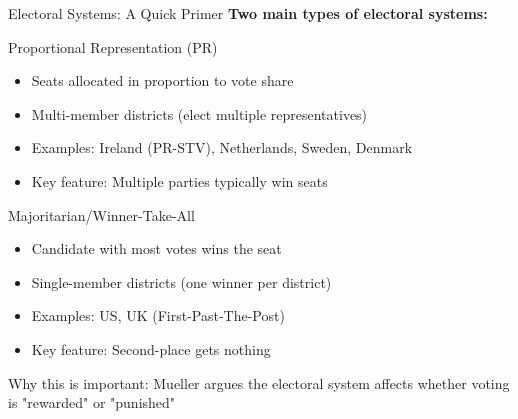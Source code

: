 \documentclass[10pt]{beamer}
\begin{document}
\begin{frame}{Electoral Systems: A Quick Primer}
\textbf{Two main types of electoral systems:}

\begin{block}{Proportional Representation (PR)}
\begin{itemize}
\item Seats allocated in proportion to vote share
\item Multi-member districts (elect multiple representatives)
\item Examples: Ireland (PR-STV), Netherlands, Sweden, Denmark
\item Key feature: Multiple parties typically win seats
\end{itemize}
\end{block}

\begin{block}{Majoritarian/Winner-Take-All}
\begin{itemize}
\item Candidate with most votes wins the seat
\item Single-member districts (one winner per district)
\item Examples: US, UK (First-Past-The-Post)
\item Key feature: Second-place gets nothing
\end{itemize}
\end{block}


\alert{Why this is important:} Mueller argues the electoral system affects whether voting is "rewarded" or "punished"
\end{frame}
\end{document}
